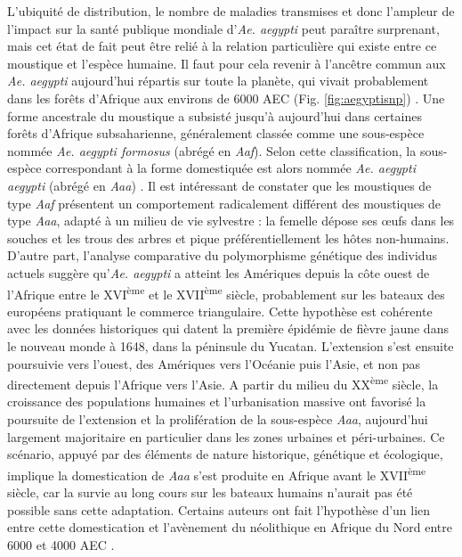 L'ubiquité de distribution, le nombre de maladies transmises et donc l'ampleur de l'impact sur la santé publique mondiale d'{\em Ae. aegypti} peut paraître surprenant, mais cet état de fait peut être relié à la relation particulière qui existe entre ce moustique et l'espèce humaine.
Il faut pour cela revenir à l'ancêtre commun aux {\em Ae. aegypti} aujourd'hui répartis sur toute la planète, qui vivait probablement dans les forêts d'Afrique aux environs de 6000 AEC (Fig. \ref{fig:aegyptisnp}) \cite{brown2014human}.
Une forme ancestrale du moustique a subsisté jusqu'à aujourd'hui dans certaines forêts d'Afrique subsaharienne, généralement classée comme une sous-espèce nommée {\em Ae. aegypti formosus} (abrégé en {\em Aaf}). Selon cette classification, la sous-espèce correspondant à la forme domestiquée est alors nommée {\em Ae. aegypti aegypti} (abrégé en {\em Aaa}) \cite{powell2013history}.
Il est intéressant de constater que les moustiques de type {\em Aaf} présentent un comportement radicalement différent des moustiques de type {\em Aaa}, adapté à un milieu de vie sylvestre : la femelle dépose ses \oe ufs dans les souches et les trous des arbres et pique préférentiellement les hôtes non-humains.
D'autre part, l'analyse comparative du polymorphisme génétique des individus actuels suggère qu'{\em Ae. aegypti} a atteint les Amériques depuis la côte ouest de l'Afrique entre le XVI\textsuperscript{ème} et le XVII\textsuperscript{ème} siècle, probablement sur les bateaux des européens pratiquant le commerce triangulaire.
Cette hypothèse est cohérente avec les données historiques qui datent la première épidémie de fièvre jaune dans le nouveau monde à 1648, dans la péninsule du Yucatan.
L'extension s'est ensuite poursuivie vers l'ouest, des Amériques vers l'Océanie puis l'Asie, et non pas directement depuis l'Afrique vers l'Asie.
A partir du milieu du XX\textsuperscript{ème} siècle, la croissance des populations humaines et l'urbanisation massive ont favorisé la poursuite de l'extension et la prolifération de la sous-espèce {\em Aaa}, aujourd'hui largement majoritaire en particulier dans les zones urbaines et péri-urbaines.
Ce scénario, appuyé par des éléments de nature historique, génétique et écologique, implique la domestication de {\em Aaa} s'est produite en Afrique avant le XVII\textsuperscript{ème} siècle, car la survie au long cours sur les bateaux humains n'aurait pas été possible sans cette adaptation.
Certains auteurs ont fait l'hypothèse d'un lien entre cette domestication et l'avènement du néolithique en Afrique du Nord entre 6000 et 4000 AEC \cite{tabachnick1991evolutionary}.

